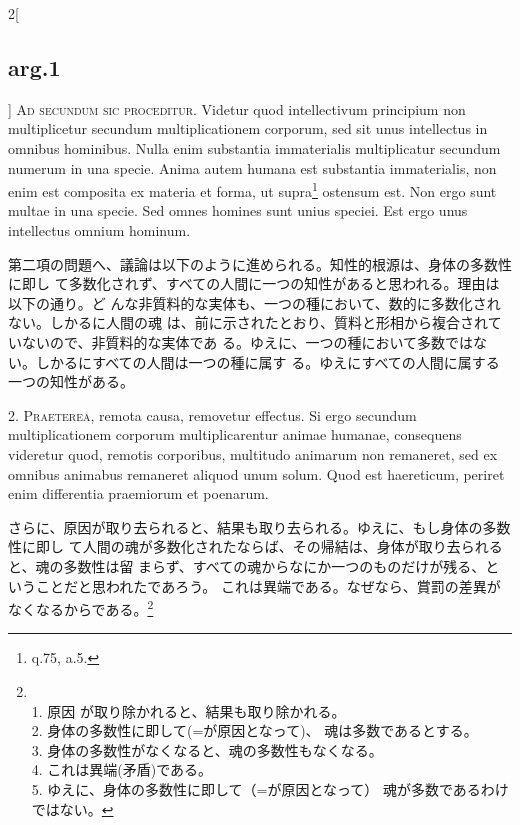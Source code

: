\documentclass[paper=a4paper,fontsize=10pt,jafontsize=9pt,titlepage]{jlreq}
\begin{document}
\begin{paracol}{2}[\subsection{arg.1}]
{\scshape Ad secundum sic proceditur}. Videtur quod intellectivum principium non
multiplicetur secundum multiplicationem corporum, sed sit unus intellectus in
omnibus hominibus. Nulla enim substantia immaterialis multiplicatur secundum
numerum in una specie. Anima autem humana est substantia immaterialis, non enim
est composita ex materia et forma, ut supra\footnote{q.75, a.5.} ostensum
est. Non ergo sunt multae in una specie. Sed omnes homines sunt unius
speciei. Est ergo unus intellectus omnium hominum.

\switchcolumn

 第二項の問題へ、議論は以下のように進められる。知性的根源は、身体の多数性に即し
 て多数化されず、すべての人間に一つの知性があると思われる。理由は以下の通り。ど
 んな非質料的な実体も、一つの種において、数的に多数化されない。しかるに人間の魂
 は、前に示されたとおり、質料と形相から複合されていないので、非質料的な実体であ
 る。ゆえに、一つの種において多数ではない。しかるにすべての人間は一つの種に属す
 る。ゆえにすべての人間に属する一つの知性がある。
  

2. {\scshape Praeterea}, remota causa, removetur effectus. Si ergo secundum
multiplicationem corporum multiplicarentur animae humanae, consequens videretur
quod, remotis corporibus, multitudo animarum non remaneret, sed ex omnibus
animabus remaneret aliquod unum solum. Quod est haereticum, periret enim
differentia praemiorum et poenarum.

\switchcolumn

さらに、原因が取り去られると、結果も取り去られる。ゆえに、もし身体の多数性に即し
て人間の魂が多数化されたならば、その帰結は、身体が取り去られると、魂の多数性は留
まらず、すべての魂からなにか一つのものだけが残る、ということだと思われたであろう。
これは異端である。なぜなら、賞罰の差異がなくなるからである。\footnote{\\1. 原因
が取り除かれると、結果も取り除かれる。\\2. 身体の多数性に即して(=が原因となって)、
魂は多数であるとする。\\3. 身体の多数性がなくなると、魂の多数性もなくなる。
\\4. これは異端(矛盾)である。\\5. ゆえに、身体の多数性に即して（=が原因となって）
魂が多数であるわけではない。}
 

\end{paracol}
\end{document}
